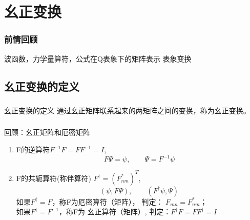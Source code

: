\section{幺正变换}

\begin{frame}
    \frametitle{前情回顾}
    \begin{itemize}
       \done 波函数，力学量算符，公式在Q表象下的矩阵表示 
       \todo 表象变换
    \end{itemize}
\end{frame} 

\subsection{幺正变换的定义}

\begin{frame} 
    \frametitle{}
    \begin{tcolorbox1}{幺正变换的定义}
    通过幺正矩阵联系起来的两矩阵之间的变换，称为幺正变换。
    \end{tcolorbox1}
\end{frame}

\begin{frame} 
    \frametitle{}
    \begin{tcolorbox1}{回顾：幺正矩阵和厄密矩阵}
        \begin{enumerate}
            \item F的逆算符$F^{-1}F=FF^{-1}=I$, $$F\Psi=\psi, \qquad \Psi=F^{-1}\psi$$  
            \item F的共轭算符(称伴算符) $F^{\dagger}=(F_{nm} ^*)^T$, $$ (\psi, F\Psi), \qquad (F^{\dagger}\psi, \Psi)$$
            如果$F^{\dagger } =F$，称F为{\color{red}厄密算符（矩阵）}， 
            判定： $F_{mn}=F_{nm} ^*$； 
            \\ 如果$ F^{\dagger }=F^{-1}$，称F为{\color{red} 幺正算符（矩阵）}, 判定：$F^{\dagger} F= FF^{\dagger}=I$
        \end{enumerate}       
    \end{tcolorbox1}
\end{frame}

